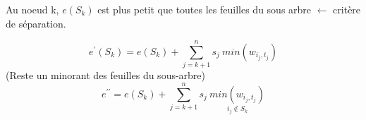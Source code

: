 \documentclass[11pt,a4paper]{article}
\newcommand{\second}{\prime\prime}
\begin{document}
	Au noeud k, $e(S_k)$ est plus petit que toutes les feuilles du sous arbre $\leftarrow$ critère de séparation.
	
	$$e^\prime(S_k) = e(S_k) + \sum_{j=k+1}^{n} s_j\ min(w_{i_{j},t_{j}})$$
	(Reste un minorant des feuilles du sous-arbre)
	$$e^{\second} = e(S_k) + \sum_{j=k+1}^{n} s_j\ \underset{i_j \notin S_k}{min(w_{i_{j},t_{j}})}$$
	
	
\end{document}
